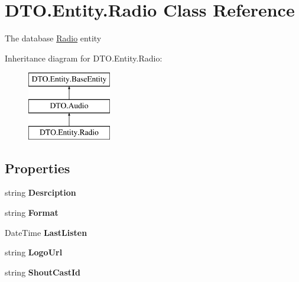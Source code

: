 \hypertarget{class_d_t_o_1_1_entity_1_1_radio}{}\section{D\+T\+O.\+Entity.\+Radio Class Reference}
\label{class_d_t_o_1_1_entity_1_1_radio}


The database \hyperlink{class_d_t_o_1_1_entity_1_1_radio}{Radio} entity  


Inheritance diagram for D\+T\+O.\+Entity.\+Radio\+:\begin{figure}[H]
\begin{center}
\leavevmode
\includegraphics[height=3.000000cm]{class_d_t_o_1_1_entity_1_1_radio}
\end{center}
\end{figure}
\subsection*{Properties}
\begin{DoxyCompactItemize}
\item 
\mbox{\label{class_d_t_o_1_1_entity_1_1_radio_ab80dc33afc8151c08566e75339db6bff}} 
string {\bfseries Desrciption}
\item 
\mbox{\label{class_d_t_o_1_1_entity_1_1_radio_aac2ea4fe421d2c670aa6ac3aea303099}} 
string {\bfseries Format}
\item 
\mbox{\label{class_d_t_o_1_1_entity_1_1_radio_a61e46a47f085108803bac41a15480903}} 
Date\+Time {\bfseries Last\+Listen}
\item 
\mbox{\label{class_d_t_o_1_1_entity_1_1_radio_a352479e427140066b624ac5902ace21f}} 
string {\bfseries Logo\+Url}
\item 
\mbox{\label{class_d_t_o_1_1_entity_1_1_radio_a081993b6d85580f5c85cc11bc4f5356c}} 
string {\bfseries Shout\+Cast\+Id}
\end{DoxyCompactItemize}
